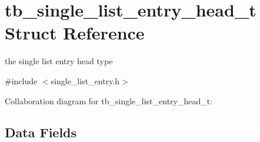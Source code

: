 \hypertarget{structtb__single__list__entry__head__t}{\section{tb\-\_\-single\-\_\-list\-\_\-entry\-\_\-head\-\_\-t Struct Reference}
\label{structtb__single__list__entry__head__t}
}


the single list entry head type  




{\ttfamily \#include $<$single\-\_\-list\-\_\-entry.\-h$>$}



Collaboration diagram for tb\-\_\-single\-\_\-list\-\_\-entry\-\_\-head\-\_\-t\-:
\subsection*{Data Fields}
